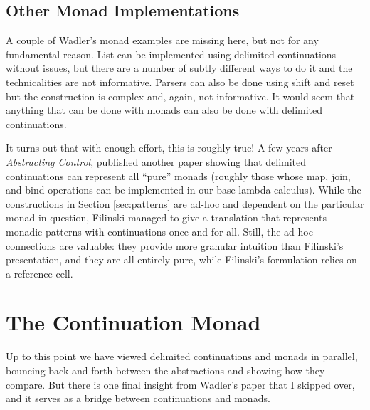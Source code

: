 \documentclass[acmsmall, nonacm, screen]{acmart}
\begin{document}
\subsection{Other Monad Implementations}
A couple of Wadler's monad examples are missing here, but not for any fundamental reason.
\textsf{List} can be implemented using delimited continuations without issues, but there are a
number of subtly different ways to do it and the technicalities are not informative.
\textsf{Parser}s can also be done using shift and reset but the construction is complex and,
again, not informative. It would seem that anything that can be done with monads can also be done
with delimited continuations.

It turns out that with enough effort, this is roughly true! A few years after {\em Abstracting
Control}, \citet{filinski1994representing} published another paper showing that delimited
continuations can represent all ``pure'' monads (roughly those whose \textsf{map}, \textsf{join},
and \textsf{bind} operations can be implemented in our base lambda calculus). While the
constructions in Section \ref{sec:patterns} are ad-hoc and dependent on the particular monad in
question, Filinski managed to give a translation that represents monadic patterns with
continuations once-and-for-all. Still, the ad-hoc connections are valuable: they provide more
granular intuition than Filinski's presentation, and they are all entirely pure, while Filinski's
formulation relies on a reference cell.

\section{The Continuation Monad} \label{sec:contmonad}

Up to this point we have viewed delimited continuations and monads in parallel, bouncing back and
forth between the abstractions and showing how they compare. But there is one final insight from
Wadler's paper that I skipped over, and it serves as a bridge between continuations and monads.
\end{document}
